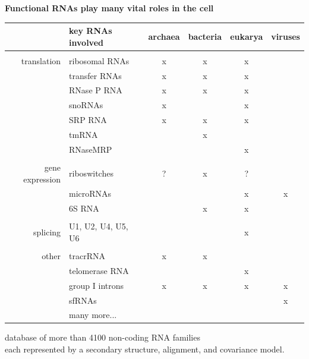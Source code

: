 \documentclass[landscape]{slides}
\begin{document}
\begin{slide}
\begin{center}
\textbf{Functional RNAs play many vital roles in the cell}
\end{center}
\medskip

\small
\begin{center}
\begin{tabular}{r|l|cccc}
 & key RNAs involved & archaea & bacteria & eukarya & viruses \\ \hline
 & \\ 
translation & ribosomal RNAs & x & x & x & \\
            & transfer RNAs  & x & x & x & \\
            & RNase P RNA    & x & x & x & \\
            & snoRNAs        & x &   & x & \\ 
            & SRP RNA        & x & x & x & \\ 
            & tmRNA          &   & x &   & \\ 
            & RNaseMRP       &   &   & x & \\ 
            &  \\ 
gene expression & riboswitches & ? & x & ? & \\
                & microRNAs &  & & x & x \\
                & 6S RNA & & x & x & \\ 
                & \\ 
splicing        & U1, U2, U4, U5, U6 & & & x & \\ 
                & \\
other           & tracrRNA       & x & x & \\
                & telomerase RNA & & & x & \\ 
                & group I introns& x & x & x & x \\
                & sfRNAs       & & & & x \\
                & many more... & & & & \\ 
\end{tabular}



database of more than 4100 non-coding RNA families \\ each represented by a
secondary structure, alignment, and covariance model.
\end{center}

\vfill
\end{slide}
\end{document}
